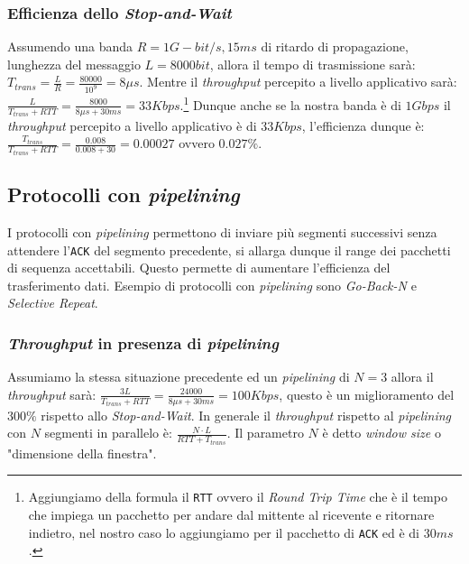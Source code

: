         \subsubsection{Efficienza dello \textit{Stop-and-Wait}}
            Assumendo una banda $ R = 1 G-bit/s, 15ms $ di ritardo di propagazione, lunghezza del messaggio $ L = 8000bit $, allora il tempo di trasmissione sarà: $T_{trans} = \frac{L}{R} = \frac{80000}{10^9} = 8\mu s$. Mentre il \textit{throughput} percepito a livello applicativo sarà: $ \frac{L}{T_{trans}+RTT}= \frac{8000}{8\mu s + 30ms} = 33 Kbps $.\footnote{Aggiungiamo della formula il \texttt{RTT} ovvero il \textit{Round Trip Time} che è il tempo che impiega un pacchetto per andare dal mittente al ricevente e ritornare indietro, nel nostro caso lo aggiungiamo per il pacchetto di \texttt{ACK} ed è di $ 30ms $.} Dunque anche se la nostra banda è di $ 1 Gbps $ il \textit{throughput} percepito a livello applicativo è di $ 33 Kbps $, l'efficienza dunque è: $ \frac{T_{trans}}{T_{trans}+RTT} = \frac{0.008}{0.008+30} = 0.00027 $ ovvero $ 0.027\% $.
    \subsection{Protocolli con \textit{pipelining}}
        I protocolli con \textit{pipelining} permettono di inviare più segmenti successivi senza attendere l'\texttt{ACK} del segmento precedente, si allarga dunque il range dei pacchetti di sequenza accettabili. Questo permette di aumentare l'efficienza del trasferimento dati. Esempio di protocolli con \textit{pipelining} sono \textit{Go-Back-N} e \textit{Selective Repeat}.
        \subsubsection{\textit{Throughput} in presenza di \textit{pipelining}}
            Assumiamo la stessa situazione precedente ed un \textit{pipelining} di $ N = 3 $ allora il \textit{throughput} sarà: $ \frac{3L}{T_{trans}+RTT} = \frac{24000}{8\mu s + 30ms} = 100 Kbps $, questo è un miglioramento del $ 300\% $ rispetto allo \textit{Stop-and-Wait}. In generale il \textit{throughput} rispetto al \textit{pipelining} con $ N $ segmenti in parallelo è: $ \frac{N \cdot L}{RTT + T_{trans}} $. Il parametro $ N $ è detto \textit{window size} o "dimensione della finestra".
